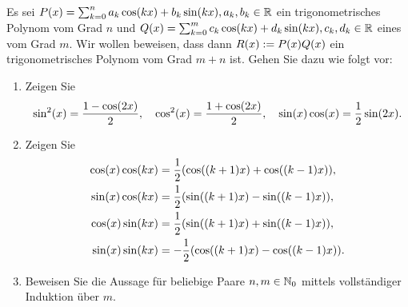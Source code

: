 \documentclass{exercise}
\begin{document}
    \begin{problem}
        Es sei \(P\parentheses*{x} = \sum_{k = 0}^n a_k \cos\parentheses*{kx} + b_k \sin\parentheses*{kx}, a_k, b_k \in \R\) ein trigonometrisches Polynom vom Grad \(n\) und \(Q\parentheses*{x} = \sum_{k = 0}^m c_k \cos\parentheses*{kx} + d_k \sin\parentheses*{kx}, c_k, d_k \in \R\) eines vom Grad \(m\).
        Wir wollen beweisen, dass dann \(R\parentheses*{x} := P\parentheses*{x}Q\parentheses*{x}\) ein trigonometrisches Polynom vom Grad \(m + n\) ist.
        Gehen Sie dazu wie folgt vor:
        \begin{enumerate}
            \item Zeigen Sie
            \[
                \sin^2\parentheses*{x} = \frac{1 - \cos\parentheses*{2x}}{2}, \quad \cos^2\parentheses*{x} = \frac{1 + \cos\parentheses*{2x}}{2}, \quad \sin\parentheses*{x}\cos\parentheses*{x} = \frac{1}{2}\sin\parentheses*{2x}.
            \]
            \item Zeigen Sie
            \begin{align*}
                \cos\parentheses*{x}\cos\parentheses*{kx} &= \frac{1}{2}\parentheses*{\cos\parentheses*{\parentheses*{k + 1}x} + \cos\parentheses*{\parentheses*{k - 1}x}},\\
                \sin\parentheses*{x}\cos\parentheses*{kx} &= \frac{1}{2}\parentheses*{\sin\parentheses*{\parentheses*{k + 1}x} - \sin\parentheses*{\parentheses*{k - 1}x}},\\
                \cos\parentheses*{x}\sin\parentheses*{kx} &= \frac{1}{2}\parentheses*{\sin\parentheses*{\parentheses*{k + 1}x} + \sin\parentheses*{\parentheses*{k - 1}x}},\\
                \sin\parentheses*{x}\sin\parentheses*{kx} &= -\frac{1}{2}\parentheses*{\cos\parentheses*{\parentheses*{k + 1}x} - \cos\parentheses*{\parentheses*{k - 1}x}}.
            \end{align*}
            \item Beweisen Sie die Aussage für beliebige Paare \(n, m \in \mathbb{N}_0\) mittels vollständiger Induktion über \(m\).
        \end{enumerate}
    \end{problem}
\end{document}
